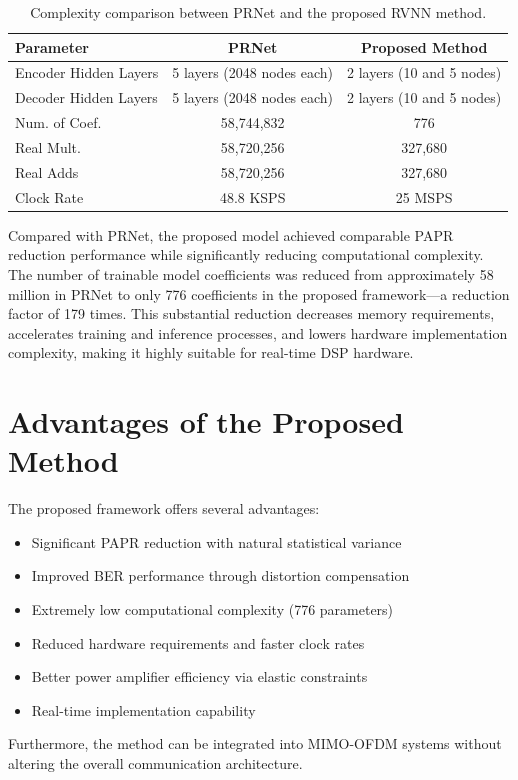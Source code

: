 \begin{table}[H]
    \centering
    \caption{Complexity comparison between PRNet and the proposed RVNN method.}
    \label{tab:complexity_comparison}
    \begin{tabular}{@{} l c c @{}}
        \toprule
        \textbf{Parameter}    & \textbf{PRNet \cite{liu2020low}} & \textbf{Proposed Method}  \\
        \midrule
        Encoder Hidden Layers & 5 layers (2048 nodes each)       & 2 layers (10 and 5 nodes) \\
        Decoder Hidden Layers & 5 layers (2048 nodes each)       & 2 layers (10 and 5 nodes) \\
        Num. of Coef.         & 58,744,832                       & 776                       \\
        Real Mult.            & 58,720,256                       & 327,680                   \\
        Real Adds             & 58,720,256                       & 327,680                   \\
        Clock Rate            & 48.8 KSPS                        & 25 MSPS                   \\
        \bottomrule
    \end{tabular}
\end{table}

Compared with PRNet, the proposed model achieved comparable PAPR reduction performance while significantly reducing computational complexity. The number of trainable model coefficients was reduced from approximately 58 million in PRNet to only 776 coefficients in the proposed framework—a reduction factor of 179 times. This substantial reduction decreases memory requirements, accelerates training and inference processes, and lowers hardware implementation complexity, making it highly suitable for real-time DSP hardware.

\section{Advantages of the Proposed Method}

The proposed framework offers several advantages:

\begin{itemize}
    \item Significant PAPR reduction with natural statistical variance
    \item Improved BER performance through distortion compensation
    \item Extremely low computational complexity (776 parameters)
    \item Reduced hardware requirements and faster clock rates
    \item Better power amplifier efficiency via elastic constraints
    \item Real-time implementation capability
\end{itemize}

Furthermore, the method can be integrated into MIMO-OFDM systems without altering the overall communication architecture.
